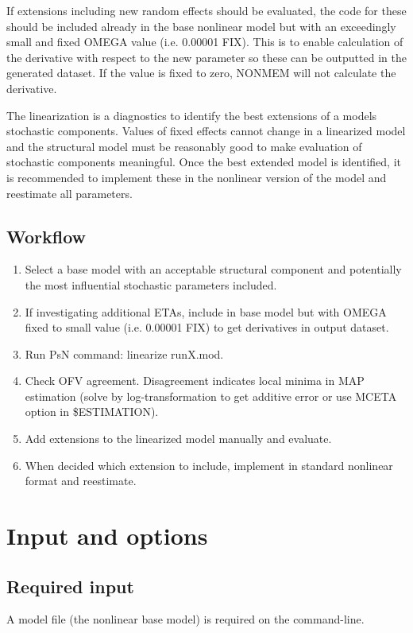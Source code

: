 If extensions including new random effects should be evaluated, the code for these should be included already in the base nonlinear model but with an 
exceedingly small and fixed OMEGA value (i.e. 0.00001 FIX). This is to enable calculation of the derivative with respect to the new parameter so these can 
be outputted in the generated dataset. If the value is fixed to zero, NONMEM will not calculate the derivative. 

The linearization is a diagnostics to identify the best extensions of a models stochastic components. Values of fixed effects cannot change in a linearized
model and the structural model must be reasonably good to make evaluation of stochastic components meaningful. Once the best extended model is identified, 
it is recommended to implement these in the nonlinear version of the model and reestimate all parameters.


\subsection{Workflow}
\begin{enumerate}
\item Select a base model with an acceptable structural component and potentially the most influential stochastic parameters included.
\item If investigating additional ETAs, include in base model but with OMEGA fixed to small value (i.e. 0.00001 FIX) to get derivatives in output dataset.
\item Run PsN command: linearize runX.mod.
\item Check OFV agreement. Disagreement indicates local minima in MAP estimation (solve by log-transformation to get additive error or use MCETA option
      in \$ESTIMATION).
\item Add extensions to the linearized model manually and evaluate.
\item When decided which extension to include, implement in standard nonlinear format and reestimate.
\end{enumerate}

\section{Input and options}
\subsection{Required input}
A model file (the nonlinear base model) is required on the command-line.

